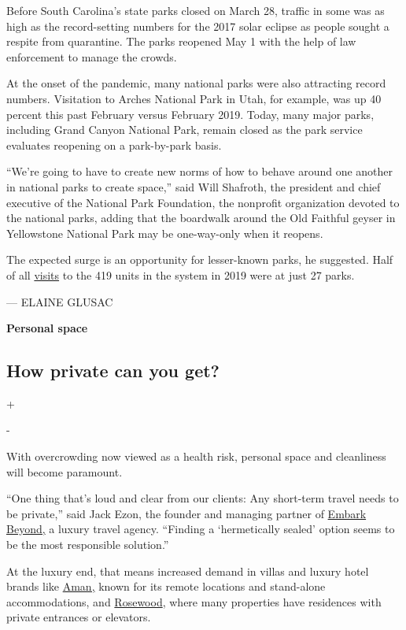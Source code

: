 Before South Carolina's state parks closed on March 28, traffic in some
was as high as the record-setting numbers for the 2017 solar eclipse as
people sought a respite from quarantine. The parks reopened May 1 with
the help of law enforcement to manage the crowds.

At the onset of the pandemic, many national parks were also attracting
record numbers. Visitation to Arches National Park in Utah, for example,
was up 40 percent this past February versus February 2019. Today, many
major parks, including Grand Canyon National Park, remain closed as the
park service evaluates reopening on a park-by-park basis.

``We're going to have to create new norms of how to behave around one
another in national parks to create space,'' said Will Shafroth, the
president and chief executive of the National Park Foundation, the
nonprofit organization devoted to the national parks, adding that the
boardwalk around the Old Faithful geyser in Yellowstone National Park
may be one-way-only when it reopens.

The expected surge is an opportunity for lesser-known parks, he
suggested. Half of all
\href{https://www.nps.gov/orgs/1207/2019-visitation-numbers.htm}{visits}
to the 419 units in the system in 2019 were at just 27 parks.

--- ELAINE GLUSAC

\textbf{Personal space}

\hypertarget{how-private-can-you-get}{%
\subsection{How private can you get?}\label{how-private-can-you-get}}

+

-

With overcrowding now viewed as a health risk, personal space and
cleanliness will become paramount.

``One thing that's loud and clear from our clients: Any short-term
travel needs to be private,'' said Jack Ezon, the founder and managing
partner of \href{https://www.embarkbeyond.com/}{Embark Beyond,} a luxury
travel agency. ``Finding a `hermetically sealed' option seems to be the
most responsible solution.''

At the luxury end, that means increased demand in villas and luxury
hotel brands like \href{https://www.aman.com/}{Aman,} known for its
remote locations and stand-alone accommodations, and
\href{https://www.rosewoodhotels.com/en/default}{Rosewood}, where many
properties have residences with private entrances or elevators.

